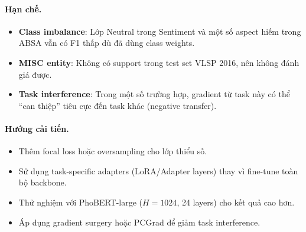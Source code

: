 \paragraph{Hạn chế.}
\begin{itemize}
    \item \textbf{Class imbalance}: Lớp Neutral trong Sentiment và một số aspect hiếm trong ABSA
          vẫn có F1 thấp dù đã dùng class weights.
    \item \textbf{MISC entity}: Không có support trong test set VLSP 2016, nên không đánh giá được.
    \item \textbf{Task interference}: Trong một số trường hợp, gradient từ task này
          có thể ``can thiệp'' tiêu cực đến task khác (negative transfer).
\end{itemize}

\paragraph{Hướng cải tiến.}
\begin{itemize}
    \item Thêm focal loss hoặc oversampling cho lớp thiểu số.
    \item Sử dụng task-specific adapters (LoRA/Adapter layers) thay vì fine-tune toàn bộ backbone.
    \item Thử nghiệm với PhoBERT-large ($H=1024$, 24 layers) cho kết quả cao hơn.
    \item Áp dụng gradient surgery hoặc PCGrad để giảm task interference.
\end{itemize}
